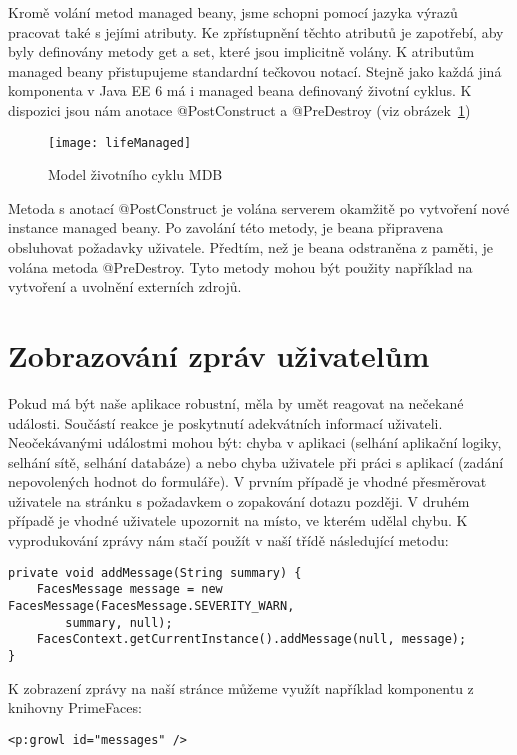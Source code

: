 \documentclass[122pt,oneside]{fithesis}
\begin{document}
Kromě volání metod managed beany, jsme schopni pomocí jazyka výrazů pracovat také s jejími atributy. Ke zpřístupnění těchto atributů je zapotřebí, aby byly definovány metody get a set, které jsou implicitně volány. K atributům managed beany přistupujeme standardní tečkovou notací. Stejně jako každá jiná komponenta v Java EE 6 má i managed beana definovaný životní cyklus. K dispozici jsou nám anotace @PostConstruct a @PreDestroy (viz obrázek~\ref{img:mdb})

\begin{figure}[!ht]
\centering
\texttt{[image: lifeManaged]}
\caption{Model životního cyklu MDB}
\label{img:mdb}
\end{figure}

Metoda s anotací @PostConstruct je volána serverem okamžitě po vytvoření nové instance managed beany. Po zavolání této metody, je beana připravena obsluhovat požadavky uživatele. Předtím, než je beana odstraněna z paměti, je volána metoda @PreDestroy. Tyto metody mohou být použity například na vytvoření a uvolnění externích zdrojů.

\section{Zobrazování zpráv uživatelům}
\label{jsfMessage}
Pokud má být naše aplikace robustní, měla by umět reagovat na nečekané události. Součástí reakce je poskytnutí adekvátních informací uživateli. Neočekávanými událostmi mohou být: chyba v aplikaci (selhání aplikační logiky, selhání sítě, selhání databáze) a nebo chyba uživatele při práci s aplikací (zadání nepovolených hodnot do formuláře). V prvním případě je vhodné přesměrovat uživatele na stránku s požadavkem o zopakování dotazu později. V druhém případě je vhodné uživatele upozornit na místo, ve kterém udělal chybu. K vyprodukování zprávy nám stačí použít v naší třídě následující metodu:

\begin{lstlisting}
private void addMessage(String summary) {
	FacesMessage message = new FacesMessage(FacesMessage.SEVERITY_WARN, 
		summary, null);
	FacesContext.getCurrentInstance().addMessage(null, message);
}
\end{lstlisting}

K zobrazení zprávy na naší stránce můžeme využít například komponentu z knihovny PrimeFaces:
\begin{lstlisting}
<p:growl id="messages" />
\end{lstlisting}
\end{document}
